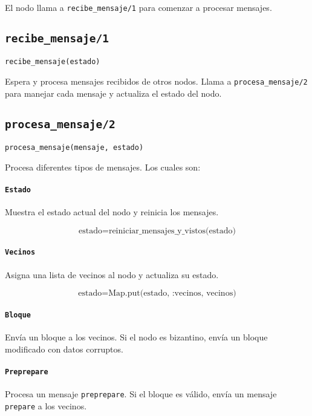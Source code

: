 {El nodo llama a \texttt{recibe\_mensaje/1} para comenzar a procesar mensajes.

\subsection*{\texttt{recibe\_mensaje/1}}
\begin{verbatim}
recibe_mensaje(estado)
\end{verbatim}

Espera y procesa mensajes recibidos de otros nodos. Llama a \texttt{procesa\_mensaje/2} para manejar cada mensaje y actualiza el estado del nodo.

\subsection*{\texttt{procesa\_mensaje/2}}
\begin{verbatim}
procesa_mensaje(mensaje, estado)
\end{verbatim}

Procesa diferentes tipos de mensajes. Los cuales son:

\paragraph{\texttt{Estado}}
Muestra el estado actual del nodo y reinicia los mensajes.

\[
\text{estado} = \text{reiniciar\_mensajes\_y\_vistos(estado)}
\]

\paragraph{\texttt{Vecinos}}
Asigna una lista de vecinos al nodo y actualiza su estado.

\[
\text{estado} = \text{Map.put(estado, :vecinos, vecinos)}
\]

\paragraph{\texttt{Bloque}}
Envía un bloque a los vecinos. Si el nodo es bizantino, envía un bloque modificado con datos corruptos.

\paragraph{\texttt{Preprepare}}
Procesa un mensaje \texttt{preprepare}. Si el bloque es válido, envía un mensaje \texttt{prepare} a los vecinos.

}
